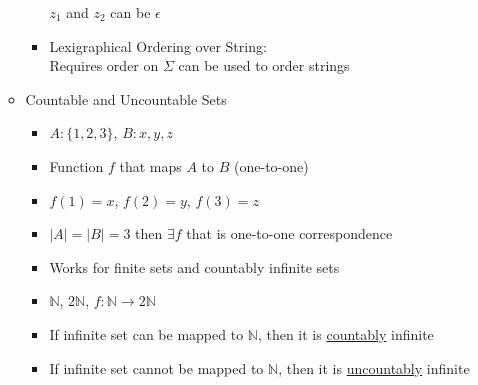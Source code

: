 \documentclass[12pt]{article}
\begin{document}
\begin{enumerate}
\begin{itemize}
\begin{itemize}
                $z_1$ and $z_2$ can be $\epsilon$
                \item Lexigraphical Ordering over String: \\
                Requires order on $\Sigma$ can be used to order strings
            \end{itemize}
            \item Countable and Uncountable Sets
            \begin{itemize}
                \item $A: \{1, 2, 3\}$, $B: {x, y, z}$
                \item Function $f$ that maps $A$ to $B$ (one-to-one)
                \item $f(1) = x$, $f(2) = y$, $f(3) = z$
                \item $|A| = |B| = 3$ then $\exists f$ that is one-to-one correspondence
                \item Works for finite sets and countably infinite sets
                \item $\mathbb{N}$, $2\mathbb{N}$, $f: \mathbb{N} \rightarrow 2\mathbb{N}$
                \item If infinite set can be mapped to $\mathbb{N}$, then it is \underline{countably} infinite
                \item If infinite set cannot be mapped to $\mathbb{N}$, then it is \underline{uncountably} infinite
            \end{itemize}
        \end{itemize}
    \end{enumerate}
\end{document}
